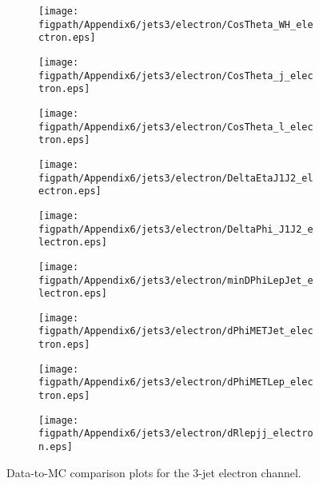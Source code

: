 \begin{figure}[!hbtp]
    \centering
    \begin{subfigure}[t]{0.317\textwidth}
        \texttt{[image: \\figpath/Appendix6/jets3/electron/CosTheta\_WH\_electron.eps]}
    \end{subfigure}
    \begin{subfigure}[t]{0.317\textwidth}
        \texttt{[image: \\figpath/Appendix6/jets3/electron/CosTheta\_j\_electron.eps]}
    \end{subfigure}
    \begin{subfigure}[t]{0.317\textwidth}
        \texttt{[image: \\figpath/Appendix6/jets3/electron/CosTheta\_l\_electron.eps]}
    \end{subfigure}

    \begin{subfigure}[t]{0.317\textwidth}
        \texttt{[image: \\figpath/Appendix6/jets3/electron/DeltaEtaJ1J2\_electron.eps]}
    \end{subfigure}
    \begin{subfigure}[t]{0.317\textwidth}
        \texttt{[image: \\figpath/Appendix6/jets3/electron/DeltaPhi\_J1J2\_electron.eps]}
    \end{subfigure}
    \begin{subfigure}[t]{0.317\textwidth}
        \texttt{[image: \\figpath/Appendix6/jets3/electron/minDPhiLepJet\_electron.eps]}
    \end{subfigure}

    \begin{subfigure}[t]{0.317\textwidth}
        \texttt{[image: \\figpath/Appendix6/jets3/electron/dPhiMETJet\_electron.eps]}
    \end{subfigure}
    \begin{subfigure}[t]{0.317\textwidth}
        \texttt{[image: \\figpath/Appendix6/jets3/electron/dPhiMETLep\_electron.eps]}
    \end{subfigure}
    \begin{subfigure}[t]{0.317\textwidth}
        \texttt{[image: \\figpath/Appendix6/jets3/electron/dRlepjj\_electron.eps]}
    \end{subfigure}
    \caption{Data-to-MC comparison plots for the 3-jet electron channel.}
    \label{fig:comparison_plots_jets3_electron_1}
\end{figure}

